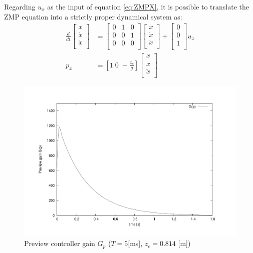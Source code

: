 Regarding $u_x$ as the input of equation \ref{eq:ZMPX}, it is possible to translate the ZMP
equation into a strictly proper dynamical system as:
\begin{equation}
\begin{aligned}
\frac{d}{dt}
\left[ 
\begin{matrix}
x \\
\dot{x} \\
\ddot{x} \\
\end{matrix}
\right] &=
\left[
\begin{matrix}
0 & 1 & 0 \\
0 & 0 & 1 \\
0 & 0 & 0 \\
\end{matrix}
\right]
\left[ 
\begin{matrix}
x \\
\dot{x} \\
\ddot{x} \\
\end{matrix}
\right]
+
\left[ 
\begin{matrix}
0 \\
0 \\
1 \\
\end{matrix}
\right]
u_x \\
p_x &= [ 1 \; 0 \; -\frac{z_c}{g} ] 
\left[ 
\begin{matrix}
x \\
\dot{x} \\
\ddot{x} \\
\end{matrix}
\right]
\end{aligned}
\label{eq:DynamicalSystem}
\end{equation}
%
\begin{figure}[htb]
\begin{center}
\includegraphics[width=0.5\linewidth]{./figures/PatternGenerator/PreviewGains}
\caption{Preview controller gain $G_p$ ($T = 5$[ms], $z_c=0.814$ [m])}
\label{pic:PreviewGains}
\end{center}
\end{figure}
